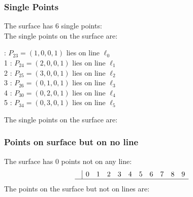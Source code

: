 \documentclass{article}
\begin{document}
{\subsubsection*{Single Points}
The surface has 6 single points:\\
The single points on the surface are:\\
\begin{multicols}{2}
 : $P_{23}=( 1, 0, 0, 1 )$ lies on line $\ell_{0}$\\
1 : $P_{24}=( 2, 0, 0, 1 )$ lies on line $\ell_{1}$\\
2 : $P_{25}=( 3, 0, 0, 1 )$ lies on line $\ell_{2}$\\
3 : $P_{26}=( 0, 1, 0, 1 )$ lies on line $\ell_{3}$\\
4 : $P_{30}=( 0, 2, 0, 1 )$ lies on line $\ell_{4}$\\
5 : $P_{34}=( 0, 3, 0, 1 )$ lies on line $\ell_{5}$\\
\end{multicols}
The single points on the surface are:\\
\subsubsection*{Points on surface but on no line}
The surface has 0 points not on any line:\\
$$
\begin{array}{r|*{10}{r}}
 & 0 & 1 & 2 & 3 & 4 & 5 & 6 & 7 & 8 & 9\\
\hline
\end{array}
$$
The points on the surface but not on lines are:\\
\begin{multicols}{2}
\noindent
\end{multicols}
}
\end{document}
